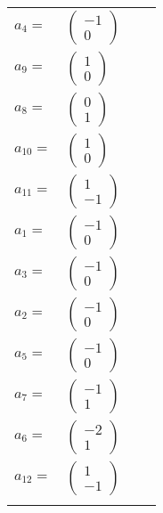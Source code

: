 \documentclass[1p]{elsarticle_modified}
\theoremstyle{definition}
\begin{document}
\begin{tabular}{m{7pt} m{180pt} m{7pt} m{180pt} }
\flushright $a_{4}=$&$\begin{pmatrix}-1\\0\end{pmatrix}$ \\
\flushright $a_{9}=$&$\begin{pmatrix}1\\0\end{pmatrix}$ \\
\flushright $a_{8}=$&$\begin{pmatrix}0\\1\end{pmatrix}$ \\
\flushright $a_{10}=$&$\begin{pmatrix}1\\0\end{pmatrix}$ \\
\flushright $a_{11}=$&$\begin{pmatrix}1\\-1\end{pmatrix}$ \\
\flushright $a_{1}=$&$\begin{pmatrix}-1\\0\end{pmatrix}$ \\
\flushright $a_{3}=$&$\begin{pmatrix}-1\\0\end{pmatrix}$ \\
\flushright $a_{2}=$&$\begin{pmatrix}-1\\0\end{pmatrix}$ \\
\flushright $a_{5}=$&$\begin{pmatrix}-1\\0\end{pmatrix}$ \\
\flushright $a_{7}=$&$\begin{pmatrix}-1\\1\end{pmatrix}$ \\
\flushright $a_{6}=$&$\begin{pmatrix}-2\\1\end{pmatrix}$ \\
\flushright $a_{12}=$&$\begin{pmatrix}1\\-1\end{pmatrix}$\\&\end{tabular}
\end{document}
